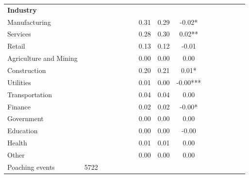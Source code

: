 {\begin{tabular}{l*{5}{ccc}}
\\ \textbf{Industry}&            &            &            &            &            &            &            &            &               \\
Manufacturing       &            &            &            &            &            &            &        0.31&        0.29&       -0.02*  \\
Services            &            &            &            &            &            &            &        0.28&        0.30&        0.02** \\
Retail              &            &            &            &            &            &            &        0.13&        0.12&       -0.01   \\
Agriculture and Mining&            &            &            &            &            &            &        0.00&        0.00&        0.00   \\
Construction        &            &            &            &            &            &            &        0.20&        0.21&        0.01*  \\
Utilities           &            &            &            &            &            &            &        0.01&        0.00&       -0.00***\\
Transportation      &            &            &            &            &            &            &        0.04&        0.04&        0.00   \\
Finance             &            &            &            &            &            &            &        0.02&        0.02&       -0.00*  \\
Government          &            &            &            &            &            &            &        0.00&        0.00&        0.00   \\
Education           &            &            &            &            &            &            &        0.00&        0.00&       -0.00   \\
Health              &            &            &            &            &            &            &        0.01&        0.01&        0.00   \\
Other               &            &            &            &            &            &            &        0.00&        0.00&        0.00   \\
\midrule
Poaching events     &        5722&            &            &            &            &            &            &            &               \\
\bottomrule
\end{tabular}
}
